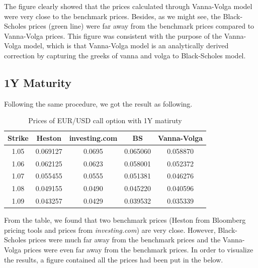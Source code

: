 \noindent
The figure clearly showed that the prices calculated through Vanna-Volga model were very close to the benchmark prices. Besides, as we might see, the Black-Scholes prices (green line) were far away from the benchmark prices compared to Vanna-Volga prices. This figure was consistent with the purpose of the Vanna-Volga model, which is that Vanna-Volga model is an analytically derived correction by capturing the greeks of vanna and volga to Black-Scholes model.

\subsection{1Y Maturity}

Following the same procedure, we got the result as following.

\begin{table}[htb]
	\centering
	\caption{Prices of EUR/USD call option with 1Y matiruty}
	\begin{tabular}{ccccc}
		\hline \hline
		Strike & Heston & investing.com & BS & Vanna-Volga \\ [0.5ex]
		\hline
		1.05 &	0.069127&	0.0695&	0.065060&	0.058870 \\ 
		1.06&	0.062125&	0.0623	&0.058001&	0.052372\\
		1.07&	0.055455&	0.0555&	0.051381&	0.046276 \\
		1.08&	0.049155&	0.0490	&0.045220&	0.040596\\
		1.09&	0.043257&	0.0429	&0.039532&	0.035339 \\ [0.5ex]
		\hline
	\end{tabular}
	\label{table:prices-1Y}
\end{table}
\noindent
From the table, we found that two benchmark prices (Heston from Bloomberg pricing tools and prices from \textit{investing.com}) are very close. However, Black-Scholes prices were much far away from the benchmark prices and the Vanna-Volga prices were even far away from the benchmark prices. In order to visualize the results, a figure contained all the prices had been put in the below.

